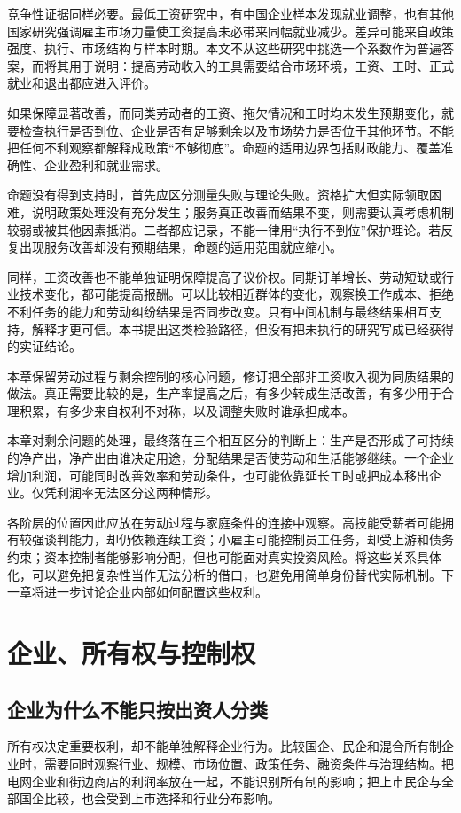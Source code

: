 \documentclass[UTF8,fontset=fandol,zihao=-4,oneside,openany]{ctexbook}
\begin{document}
竞争性证据同样必要。最低工资研究中，有中国企业样本发现就业调整，也有其他国家研究强调雇主市场力量使工资提高未必带来同幅就业减少。差异可能来自政策强度、执行、市场结构与样本时期。本文不从这些研究中挑选一个系数作为普遍答案，而将其用于说明：提高劳动收入的工具需要结合市场环境，工资、工时、正式就业和退出都应进入评价。\cite{MinWage2014,Card2022}

如果保障显著改善，而同类劳动者的工资、拖欠情况和工时均未发生预期变化，就要检查执行是否到位、企业是否有足够剩余以及市场势力是否位于其他环节。不能把任何不利观察都解释成政策“不够彻底”。命题的适用边界包括财政能力、覆盖准确性、企业盈利和就业需求。

\label{arg:P074}
命题没有得到支持时，首先应区分测量失败与理论失败。资格扩大但实际领取困难，说明政策处理没有充分发生；服务真正改善而结果不变，则需要认真考虑机制较弱或被其他因素抵消。二者都应记录，不能一律用“执行不到位”保护理论。若反复出现服务改善却没有预期结果，命题的适用范围就应缩小。

同样，工资改善也不能单独证明保障提高了议价权。同期订单增长、劳动短缺或行业技术变化，都可能提高报酬。可以比较相近群体的变化，观察换工作成本、拒绝不利任务的能力和劳动纠纷结果是否同步改变。只有中间机制与最终结果相互支持，解释才更可信。本书提出这类检验路径，但没有把未执行的研究写成已经获得的实证结论。

本章保留劳动过程与剩余控制的核心问题，修订把全部非工资收入视为同质结果的做法。真正需要比较的是，生产率提高之后，有多少转成生活改善，有多少用于合理积累，有多少来自权利不对称，以及调整失败时谁承担成本。

\label{arg:P075}
本章对剩余问题的处理，最终落在三个相互区分的判断上：生产是否形成了可持续的净产出，净产出由谁决定用途，分配结果是否使劳动和生活能够继续。一个企业增加利润，可能同时改善效率和劳动条件，也可能依靠延长工时或把成本移出企业。仅凭利润率无法区分这两种情形。

各阶层的位置因此应放在劳动过程与家庭条件的连接中观察。高技能受薪者可能拥有较强谈判能力，却仍依赖连续工资；小雇主可能控制员工任务，却受上游和债务约束；资本控制者能够影响分配，但也可能面对真实投资风险。将这些关系具体化，可以避免把复杂性当作无法分析的借口，也避免用简单身份替代实际机制。下一章将进一步讨论企业内部如何配置这些权利。


\chapter{企业、所有权与控制权}
\section{企业为什么不能只按出资人分类}
所有权决定重要权利，却不能单独解释企业行为。比较国企、民企和混合所有制企业时，需要同时观察行业、规模、市场位置、政策任务、融资条件与治理结构。把电网企业和街边商店的利润率放在一起，不能识别所有制的影响；把上市民企与全部国企比较，也会受到上市选择和行业分布影响。
\end{document}
